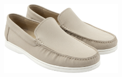 \documentclass[10pt]{article}
\begin{document}
\begin{minipage}[c][59.33mm][c]{59.33mm}
\end{minipage} \hspace*{6.00mm} \begin{minipage}[c][59.33mm][c]{59.33mm}\centering
\includegraphics[width=59.33mm,height=59.33mm,keepaspectratio]{assets/shoes/mocassino-beige.png}\
\end{minipage}\
\vspace*{6.00mm}\
\end{document}
